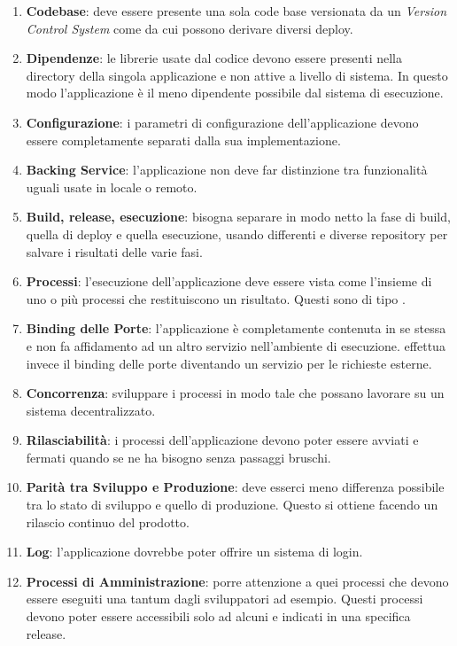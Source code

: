 \begin{enumerate}
	\item \textbf{Codebase}: deve essere presente una sola code base versionata da un \textit{Version Control System} come  da cui possono derivare diversi deploy.
	\item \textbf{Dipendenze}: le librerie usate dal codice devono essere presenti nella directory della singola applicazione e non attive a livello di sistema. In questo modo l'applicazione è il meno dipendente possibile dal sistema di esecuzione.
	\item \textbf{Configurazione}: i parametri di configurazione dell'applicazione devono essere completamente separati dalla sua implementazione.
	\item \textbf{Backing Service}: l'applicazione non deve far distinzione tra funzionalità uguali usate in locale o remoto.
	\item \textbf{Build, release, esecuzione}: bisogna separare in modo netto la fase di build, quella di deploy e quella esecuzione, usando  differenti e diverse repository per salvare i risultati delle varie fasi.
	\item \textbf{Processi}: l'esecuzione dell'applicazione deve essere vista come l'insieme di uno o più processi che restituiscono un risultato. Questi sono di tipo .
	\item \textbf{Binding delle Porte}: l'applicazione è completamente contenuta in se stessa e non fa affidamento ad un altro servizio nell'ambiente di esecuzione. effettua invece il binding delle porte diventando un servizio per le richieste esterne.
	\item \textbf{Concorrenza}: sviluppare i processi in modo tale che possano lavorare su un sistema decentralizzato.
	\item \textbf{Rilasciabilità}: i processi dell'applicazione devono poter essere avviati e fermati quando se ne ha bisogno senza passaggi bruschi.
	\item \textbf{Parità tra Sviluppo e Produzione}: deve esserci meno differenza possibile tra lo stato di sviluppo e quello di produzione. Questo si ottiene facendo un rilascio continuo del prodotto.
	\item \textbf{Log}: l'applicazione dovrebbe poter offrire un sistema di login.
	\item \textbf{Processi di Amministrazione}: porre attenzione a quei processi che devono essere eseguiti una tantum dagli sviluppatori ad esempio. Questi processi devono poter essere accessibili solo ad alcuni e indicati in una specifica release.
\end{enumerate}

